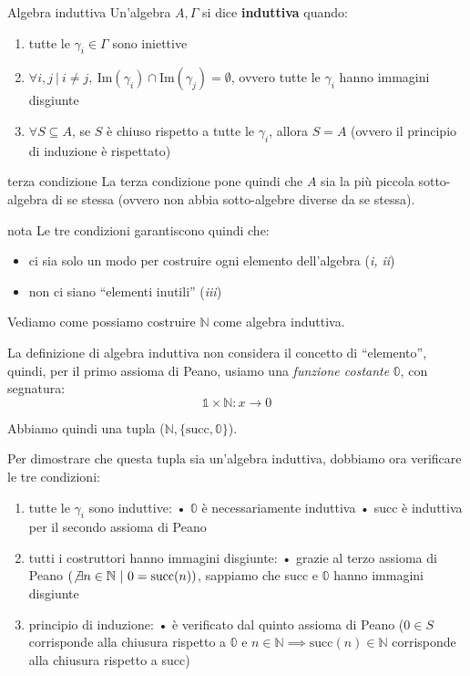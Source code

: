 \documentclass[a4paper,11pt]{report}
\begin{document}
\begin{defbox}{Algebra induttiva}{}
    Un'algebra \( A, \Gamma \) si dice \textbf{induttiva} quando:
    \begin{enumerate}
        \item tutte le \( \gamma_i \in \Gamma\) sono iniettive
        \item \( \forall i, j \ | \ i \neq j , \ \text{Im}(\gamma_i) \cap \text{Im}(\gamma_j) = \emptyset \), ovvero tutte le \( \gamma_i \) hanno immagini disgiunte
        \item \( \forall S\subseteq A \), se \( S \) è chiuso rispetto a tutte le \( \gamma_i \), allora \( S = A \) (ovvero il principio di induzione è rispettato)   
    \end{enumerate}
    \begin{gbox}{terza condizione}
        La terza condizione pone quindi che \( A \) sia la più piccola sotto-algebra di se stessa (ovvero non abbia sotto-algebre diverse da se stessa).
    \end{gbox}       
    \begin{gbox}{nota}
        Le tre condizioni garantiscono quindi che:
        \begin{itemize}
            \item ci sia solo un modo per costruire ogni elemento dell'algebra (\textit{i, ii})
            \item non ci siano ``elementi inutili'' (\textit{iii})
        \end{itemize}
    \end{gbox}

\end{defbox}

Vediamo come possiamo costruire \( \mathbb{N} \) come algebra induttiva.

La definizione di algebra induttiva non considera il concetto di ``elemento'', quindi, per il primo assioma di Peano, usiamo una \textit{funzione costante} \( \mathbb{0} \), con segnatura:
\[\mathbb{1} \times \mathbb{N} : x\to 0 \]

Abbiamo quindi una tupla (\( \mathbb{N}, \{\text{succ}, \mathbb{0}\} \)).

Per dimostrare che  questa tupla sia un'algebra induttiva, dobbiamo ora verificare le tre condizioni:
\begin{enumerate}
    \item tutte le \( \gamma_i \) sono induttive:
        \subitem • \( \mathbb{0} \) è necessariamente induttiva
        \subitem • succ è induttiva per il secondo assioma di Peano
    \item tutti i costruttori hanno immagini disgiunte:
        \subitem • grazie al terzo assioma di Peano \((\not\exists n \in \mathbb{N} \ | \ 0 = \text{succ}(n)) \), sappiamo che succ e \( \mathbb{0} \) hanno immagini disgiunte
    \item principio di induzione:
        \subitem • è verificato dal quinto assioma di Peano (\( 0 \in S\) corrisponde alla chiusura rispetto a \(\mathbb{0} \) e \( n \in \mathbb{N} \implies \text{succ}(n) \in \mathbb{N}\) corrisponde alla chiusura rispetto a succ)
\end{enumerate}
\end{document}
